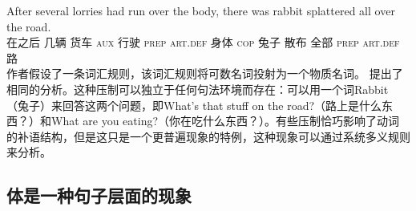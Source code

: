 \ea
\gll After several lorries had run over the body, there was rabbit splattered all over the road.\\
     在之后 几辆 货车 \textsc{aux} 行驶 \textsc{prep} \textsc{art}.\textsc{def} 身体 \expl{} \textsc{cop} 兔子 散布 全部 \textsc{prep} \textsc{art}.\textsc{def} 路\\
\z
作者假设了一条词汇规则，该词汇规则将可数名词投射为一个物质名词。 \citet[--115]{Fillmore99a}提出了相同的分析。这种压制可以独立于任何句法环境而存在：可以用一个词Rabbit（兔子）来回答这两个问题，即What's that stuff on the road?（路上是什么东西？）和What are you eating?（你在吃什么东西？）。有些压制恰巧影响了动词的补语结构，但是这只是一个更普遍现象的特例，这种现象可以通过系统多义规则来分析。

\subsection{体是一种句子层面的现象}
\label{sec-aspect-at-clause-level}

